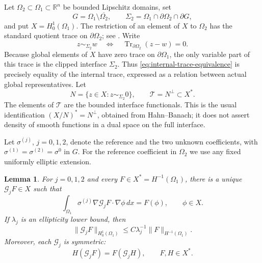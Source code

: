\documentclass[11pt,oneside]{article}
\newtheorem{lemma}[theorem]{Lemma}
\newcommand{\R}{\mathbb R}
\begin{document}
Let \(\Omega_2\subset\Omega_1\subset\R^n\) be bounded Lipschitz domains, set
\begin{equation}
  G=\Omega_1\setminus\overline{\Omega_2},
  \qquad
  \Sigma_2=\Omega_1\cap\partial\Omega_2\cap\partial G,
\end{equation}
and put \(X=H^1_0(\Omega_1)\).  The restriction of an element of \(X\) to
\(\Omega_2\) has the standard quotient trace on \(\partial\Omega_2\); see
\cite[Chapters 3--4]{McLean2000}.  Write
\begin{equation}
  z\sim_{\Sigma_2}w
  \quad\Longleftrightarrow\quad
  \operatorname{Tr}_{\partial\Omega_2}(z-w)=0.
  \label{eq:internal-trace-equivalence}
\end{equation}
Because global elements of \(X\) have zero trace on \(\partial\Omega_1\), the
only variable part of this trace is the clipped interface \(\Sigma_2\).  Thus
\eqref{eq:internal-trace-equivalence} is precisely equality of the internal
trace, expressed as a relation between actual global representatives.  Let
\begin{equation}
  N=\{z\in X:z\sim_{\Sigma_2}0\},
  \qquad
  \mathcal T=N^\perp\subset X^*.
  \label{eq:interface-annihilator}
\end{equation}
The elements of \(\mathcal T\) are the bounded interface functionals.  This is
the usual identification \((X/N)^*=N^\perp\), obtained from Hahn--Banach; it
does not assert density of smooth functions in a dual space on the full
interface.

Let \(\sigma^{(j)}\), \(j=0,1,2\), denote the reference and the two unknown
coefficients, with \(\sigma^{(1)}=\sigma^{(2)}=\sigma^0\) in \(G\).  For the
reference coefficient in \(\Omega_2\) we use any fixed uniformly elliptic
extension.

\begin{lemma}
\label{lem:variational-green-sources}
For \(j=0,1,2\) and every \(F\in X^*=H^{-1}(\Omega_1)\), there is a unique
\(\mathcal G_jF\in X\) such that
\begin{equation}
  \int_{\Omega_1}\sigma^{(j)}\nabla\mathcal G_jF\cdot\nabla\phi\,dx
  =F(\phi),
  \qquad \phi\in X.
  \label{eq:variational-green}
\end{equation}
If \(\lambda_j\) is an ellipticity lower bound, then
\begin{equation}
  \|\mathcal G_jF\|_{H^1_0(\Omega_1)}
  \le C\lambda_j^{-1}\|F\|_{H^{-1}(\Omega_1)}.
  \label{eq:green-coercive-estimate}
\end{equation}
Moreover, each \(\mathcal G_j\) is symmetric:
\begin{equation}
  H(\mathcal G_jF)=F(\mathcal G_jH),
  \qquad F,H\in X^*.
  \label{eq:green-symmetry}
\end{equation}
\end{lemma}
\end{document}
